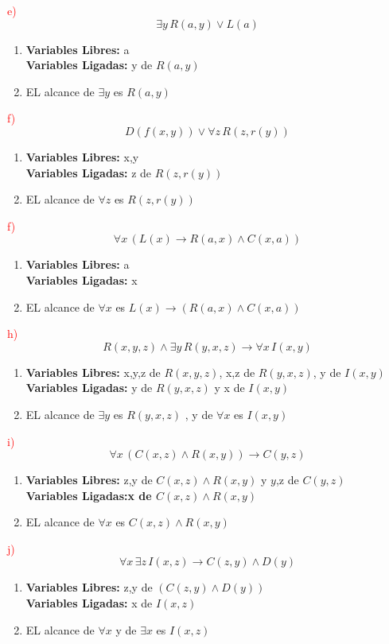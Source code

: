 \textcolor{red}{e)} \[ \exists y \, R(a, y) \lor L(a) \]
\begin{enumerate}
    \item \textbf{Variables Libres:} a \\
    \textbf{Variables Ligadas:} y de $R(a, y)$
    \item EL alcance de $\exists y$ es $R(a, y)$
\end{enumerate}

\textcolor{red}{f)} \[ D (f(x, y)) \lor \forall z \, R(z, r(y)) \]
\begin{enumerate}
    \item \textbf{Variables Libres:} x,y\\
    \textbf{Variables Ligadas:} z de $R(z, r(y))$
    \item EL alcance de $\forall z$ es $R(z, r(y))$
\end{enumerate}

\textcolor{red}{f)} \[ \forall x \, (L(x) \rightarrow R(a, x) \land C(x, a)) \]
\begin{enumerate}
    \item \textbf{Variables Libres:} a\\
    \textbf{Variables Ligadas:} x
    \item EL alcance de $\forall x$ es $L(x) \rightarrow (R(a, x) \land C(x, a))$
\end{enumerate}

\textcolor{red}{h)} \[ R(x, y, z) \land \exists y \, R(y, x, z) \rightarrow \forall x \, I(x, y) \]
\begin{enumerate}
    \item \textbf{Variables Libres:} x,y,z de $R(x, y, z)$, x,z de $R(y, x, z)$, y de $I(x, y)$ \\
    \textbf{Variables Ligadas:} y de $R(y, x, z)$ y x de $I(x, y)$
    \item EL alcance de $\exists y$ es $R(y, x, z)$ , y de $\forall x$ es $I(x, y)$
\end{enumerate}

\textcolor{red}{i)} \[ \forall x \, (C(x, z) \land R(x, y)) \rightarrow C(y, z) \]
\begin{enumerate}
    \item \textbf{Variables Libres:} z,y de $C(x, z) \land R(x, y)$ y $y$,z de $C(y, z)$\\
    \textbf{Variables Ligadas:x de $C(x, z) \land R(x, y)$} 
    \item EL alcance de $\forall x$ es $C(x, z) \land R(x, y)$
\end{enumerate}

\textcolor{red}{j)} \[ \forall x \, \exists z \, I(x, z) \rightarrow C(z, y) \land D(y) \]
\begin{enumerate}
    \item \textbf{Variables Libres:} z,y de $(C(z, y) \land D(y))$\\
    \textbf{Variables Ligadas:} x de $I(x, z)$
    \item EL alcance de $\forall x$ y de $\exists x$ es $I(x, z)$
\end{enumerate}
